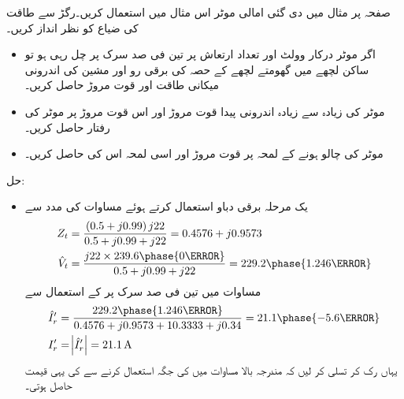صفحہ  پر مثال   میں دی گئی امالی موٹر اس مثال میں استعمال کریں۔رگڑ سے طاقت کی ضیاع کو نظر انداز کریں۔
\begin{itemize}
\item
اگر موٹر درکار وولٹ اور تعداد ارتعاش پر تین فی صد سرک پر چل رہی ہو تو  ساکن لچھے میں گھومتے لچھے کے حصہ کی برقی رو  اور مشین کی اندرونی میکانی طاقت اور قوت مروڑ حاصل کریں۔
\item
موٹر کی زیادہ سے زیادہ اندرونی پیدا قوت مروڑ اور اس قوت مروڑ پر موٹر کی رفتار حاصل کریں۔
\item
موٹر کی چالو ہونے کے لمحہ پر قوت مروڑ اور اسی لمحہ اس کی   حاصل کریں۔ 
\end{itemize}

حل:
\begin{itemize}
\item
 یک مرحلہ  برقی دباو   استعمال کرتے ہوئے مساوات   کی مدد سے
\begin{align*}
Z_t&=\frac{\left(0.5+j 0.99 \right) j 22}{0.5+j 0.99+j 22}=0.4576+j 0.9573\\
\hat{V}_t&=\frac{j 22 \times 239.6 \phase{0\degree}}{0.5+j 0.99+j 22}=229.2\phase{1.246\degree}
\end{align*}
مساوات   میں  تین فی صد سرک پر  کے استعمال سے
\begin{align*}
\hat{I}_r'&=\frac{229.2 \phase{1.246\degree}}{0.4576+j 0.9573+10.3333+j 0.34}=21.1\phase{-5.6\degree}\\
I_r'&=\abs{\hat{I}_r'}=\SI{21.1}{\ampere}
\end{align*}
یہاں رک کر تسلی کر لیں کہ مندرجہ بالا مساوات میں  کی جگہ  استعمال کرنے سے  کی یہی قیمت حاصل ہوتی۔


\end{itemize}

